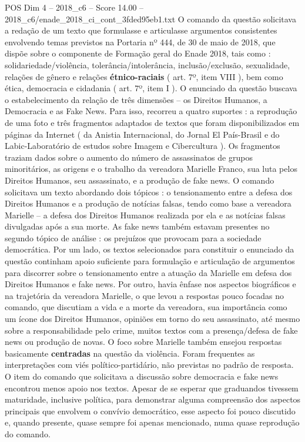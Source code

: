 \begin{textsample}{POS Dim 4 – 2018\_c6 – Score 14.00 – 2018\_c6/enade\_2018\_ci\_cont\_3fded95eb1.txt}
O comando da questão solicitava a redação de um texto que formulasse e articulasse argumentos consistentes envolvendo temas previstos na Portaria nº 444, de 30 de maio de 2018, que dispõe sobre o componente de Formação geral do Enade 2018, tais como : solidariedade/violência, tolerância/intolerância, inclusão/exclusão, sexualidade, relações de gênero e relações \textbf{étnico-raciais} ( art. 7º, item VIII ), bem como ética, democracia e cidadania ( art. 7º, item I ).
O enunciado da questão buscava o estabelecimento da relação de três dimensões – os Direitos Humanos, a Democracia e as Fake News.
Para isso, recorreu a quatro suportes : a reprodução de uma foto e três fragmentos adaptados de textos que foram disponibilizados em páginas da Internet ( da Anistia Internacional, do Jornal El País-Brasil e do Labic-Laboratório de estudos sobre Imagem e Cibercultura ).
Os fragmentos traziam dados sobre o aumento do número de assassinatos de grupos minoritários, as origens e o trabalho da vereadora Marielle Franco, sua luta pelos Direitos Humanos, seu assassinato, e a produção de fake news.
O comando solicitava um texto abordando dois tópicos : o tensionamento entre a defesa dos Direitos Humanos e a produção de notícias falsas, tendo como base a vereadora Marielle – a defesa dos Direitos Humanos realizada por ela e as notícias falsas divulgadas após a sua morte.
As fake news também estavam presentes no segundo tópico de análise : os prejuízos que provocam para a sociedade democrática.
Por um lado, os textos selecionados para constituir o enunciado da questão continham apoio suficiente para formulação e articulação de argumentos para discorrer sobre o tensionamento entre a atuação da Marielle em defesa dos Direitos Humanos e fake news.
Por outro, havia ênfase nos aspectos biográficos e na trajetória da vereadora Marielle, o que levou a respostas pouco focadas no comando, que discutiam a vida e a morte da vereadora, sua importância como um ícone dos Direitos Humanos, opiniões em torno do seu assassinato, até mesmo sobre a responsabilidade pelo crime, muitos textos com a presença/defesa de fake news ou produção de novas.
O foco sobre Marielle também ensejou respostas basicamente \textbf{centradas} na questão da violência.
Foram frequentes as interpretações com viés político-partidário, não previstas no padrão de resposta.
O item do comando que solicitava a discussão sobre democracia e fake news encontrou menos apoio nos textos.
Apesar de se esperar que graduandos tivessem maturidade, inclusive política, para demonstrar alguma compreensão dos aspectos principais que envolvem o convívio democrático, esse aspecto foi pouco discutido e, quando presente, quase sempre foi apenas mencionado, numa quase reprodução do comando.

\end{textsample}
